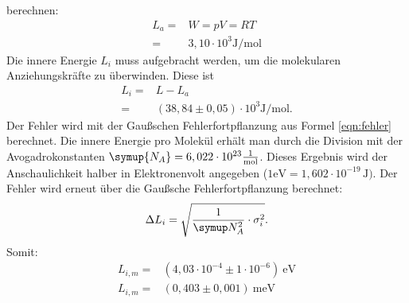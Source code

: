 berechnen:
\begin{align*}
  L_a =& W =pV=RT \\
      =& 3,10 \cdot 10^3 \si{\joule \per \mol}
\end{align*}
Die innere Energie $L_i$ muss aufgebracht werden, um die molekularen
Anziehungskräfte zu überwinden. Diese ist
\begin{align*}
  L_i=&L-L_a \\
  =& (38,84 \pm 0,05)\cdot 10^3 \si{\joule\per\mol}.
\end{align*}
Der Fehler wird mit der Gaußschen Fehlerfortpflanzung aus Formel \eqref{eqn:fehler}
berechnet.
Die innere Energie pro Molekül erhält man durch die Division mit der Avogadrokonstanten
$\symup{N_A}=6,022 \cdot 10^{23} \frac{1}{\si{\mol}}$.
Dieses Ergebnis wird der Anschaulichkeit halber in Elektronenvolt angegeben
($1\si{\electronvolt}=1,602\cdot 10^{-19}\, \si{\joule})$.
Der Fehler wird erneut über die Gaußsche Fehlerfortpflanzung berechnet:
\begin{equation*}
   \Delta L_i=\sqrt{\frac{1}{\symup N_A^2}\cdot \sigma_{i}^2}.
\end{equation*}
Somit:
\begin{align*}
   L_{i,m} =&(4,03\cdot 10^{-4} \pm 1\cdot 10^{-6})\ \si{\electronvolt} \\
   L_{i,m} =&(0,403 \pm 0,001) \ \si{\milli\electronvolt}
\end{align*}
